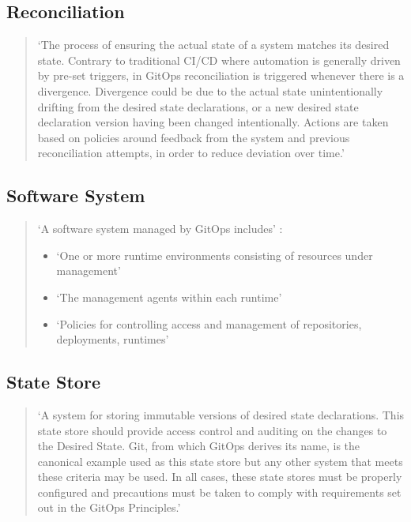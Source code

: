 \subsection*{Reconciliation}
\begin{quotation}
\noindent
\enquote*{The process of ensuring the actual state of a system matches its desired state. Contrary to traditional CI/CD where automation is generally driven by pre-set triggers, in GitOps reconciliation is triggered whenever there is a divergence. Divergence could be due to the actual state unintentionally drifting from the desired state declarations, or a new desired state declaration version having been changed intentionally. Actions are taken based on policies around feedback from the system and previous reconciliation attempts, in order to reduce deviation over time.}
\autocite{gitopsGlossary}
\end{quotation}

\subsection*{Software System}
\begin{quotation}
\noindent
\enquote*{A software system managed by GitOps includes} \autocite{gitopsGlossary}:
\begin{itemize}
	\item \enquote*{One or more runtime environments consisting of resources under management}
	\item \enquote*{The management agents within each runtime}
	\item \enquote*{Policies for controlling access and management of repositories, deployments, runtimes}
	\autocite{gitopsGlossary}
\end{itemize}
\end{quotation}

\subsection*{State Store}
\begin{quotation}
\noindent
\enquote*{A system for storing immutable versions of desired state declarations. This state store should provide access control and auditing on the changes to the Desired State. Git, from which GitOps derives its name, is the canonical example used as this state store but any other system that meets these criteria may be used. In all cases, these state stores must be properly configured and precautions must be taken to comply with requirements set out in the GitOps Principles.}
\autocite{gitopsGlossary}
\end{quotation}

